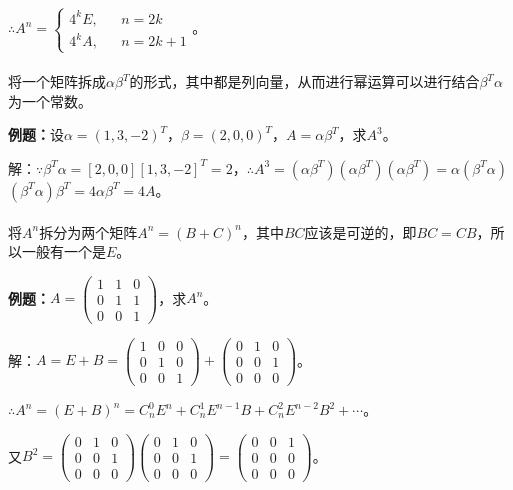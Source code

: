 $\therefore A^n=\left\{\begin{array}{lcl}
    4^kE, & & n=2k \\
    4^kA, & & n=2k+1
\end{array}\right.$。

\paragraph{}

将一个矩阵拆成$\alpha\beta^T$的形式，其中都是列向量，从而进行幂运算可以进行结合$\beta^T\alpha$为一个常数。

\textbf{例题：}设$\alpha=(1,3,-2)^T$，$\beta=(2,0,0)^T$，$A=\alpha\beta^T$，求$A^3$。

解：$\because\beta^T\alpha=[2,0,0][1,3,-2]^T=2$，$\therefore A^3=(\alpha\beta^T)(\alpha\beta^T)(\alpha\beta^T)=\alpha(\beta^T\alpha)$\\$(\beta^T\alpha)\beta^T=4\alpha\beta^T=4A$。

\paragraph{}

将$A^n$拆分为两个矩阵$A^n=(B+C)^n$，其中$BC$应该是可逆的，即$BC=CB$，所以一般有一个是$E$。\medskip

\textbf{例题：}$A=\left(\begin{array}{ccc}
    1 & 1 & 0 \\
    0 & 1 & 1 \\
    0 & 0 & 1
\end{array}\right)$，求$A^n$。\medskip

解：$A=E+B=\left(\begin{array}{ccc}
    1 & 0 & 0 \\
    0 & 1 & 0 \\
    0 & 0 & 1
\end{array}\right)+\left(\begin{array}{ccc}
    0 & 1 & 0 \\
    0 & 0 & 1 \\
    0 & 0 & 0
\end{array}\right)$。\medskip

$\therefore A^n=(E+B)^n=C_n^0E^n+C_n^1E^{n-1}B+C_n^2E^{n-2}B^2+\cdots$。

又$B^2=\left(\begin{array}{ccc}
    0 & 1 & 0 \\
    0 & 0 & 1 \\
    0 & 0 & 0
\end{array}\right)\left(\begin{array}{ccc}
    0 & 1 & 0 \\
    0 & 0 & 1 \\
    0 & 0 & 0
\end{array}\right)=\left(\begin{array}{ccc}
    0 & 0 & 1 \\
    0 & 0 & 0 \\
    0 & 0 & 0
\end{array}\right)$。

